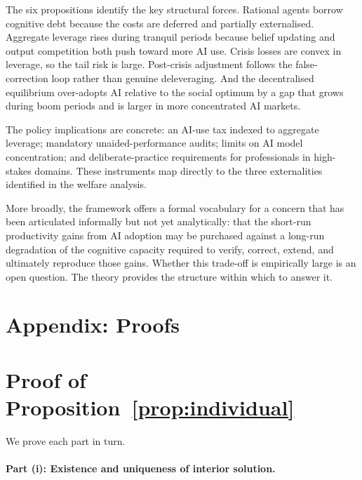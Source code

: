 \documentclass[12pt]{article}
\begin{document}
The six propositions identify the key structural forces. Rational agents borrow
cognitive debt because the costs are deferred and partially externalised. Aggregate
leverage rises during tranquil periods because belief updating and output competition
both push toward more AI use. Crisis losses are convex in leverage, so the tail risk
is large. Post-crisis adjustment follows the false-correction loop rather than genuine
deleveraging. And the decentralised equilibrium over-adopts AI relative to the social
optimum by a gap that grows during boom periods and is larger in more concentrated AI
markets.

The policy implications are concrete: an AI-use tax indexed to aggregate leverage;
mandatory unaided-performance audits; limits on AI model concentration; and
deliberate-practice requirements for professionals in high-stakes domains. These
instruments map directly to the three externalities identified in the welfare analysis.

More broadly, the framework offers a formal vocabulary for a concern that has been
articulated informally but not yet analytically: that the short-run productivity
gains from AI adoption may be purchased against a long-run degradation of the
cognitive capacity required to verify, correct, extend, and ultimately reproduce
those gains. Whether this trade-off is empirically large is an open question. The
theory provides the structure within which to answer it.

\newpage



\newpage
\appendix
\section*{Appendix: Proofs}

\setcounter{section}{1}
\renewcommand{\thesection}{\Alph{section}}

\section{Proof of Proposition~\ref{prop:individual}}
\label{app:prop1}

We prove each part in turn.

\paragraph{Part (i): Existence and uniqueness of interior solution.}
\end{document}
